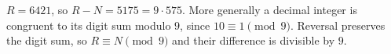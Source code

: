 $R=6421$, so $R-N=5175=9\cdot575$. More generally a decimal integer is congruent to its digit sum modulo $9$, since $10\equiv1\pmod9$. Reversal preserves the digit sum, so $R\equiv N\pmod9$ and their difference is divisible by $9$.
